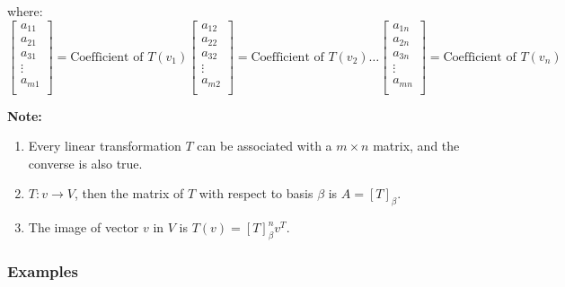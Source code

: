 \documentclass[english,course,fleqn]{lecture}
\begin{document}
where:
\[
  \begin{bmatrix}
    a_{11}  \\ 
    a_{21}  \\ 
    a_{31}  \\ 
    \vdots  \\ 
    a_{m1}  \\ 
  \end{bmatrix} = \text{Coefficient of } T(v_{1})
  \begin{bmatrix}
    a_{12}  \\ 
    a_{22}  \\ 
    a_{32}  \\ 
    \vdots  \\ 
    a_{m2}  \\ 
  \end{bmatrix} = \text{Coefficient of } T(v_{2})
  \ldots
  \begin{bmatrix}
    a_{1n}  \\ 
    a_{2n}  \\ 
    a_{3n}  \\ 
    \vdots  \\ 
    a_{mn}  \\ 
  \end{bmatrix} = \text{Coefficient of } T(v_{n})
\]

\textbf{Note:}
\begin{enumerate}
  \item Every linear transformation $T$ can be associated with a $m \times n$ matrix, and the converse is also true.
  \item $T:v \rightarrow V$, then the matrix of $T$ with respect to basis $\beta$ is $A = {[T]}_{\beta}$.
  \item The image of vector $v$ in $V$ is $T(v) = {[T]}_{\beta}^{n}v^{T}$.
\end{enumerate}

\subsubsection{Examples}
\end{document}
